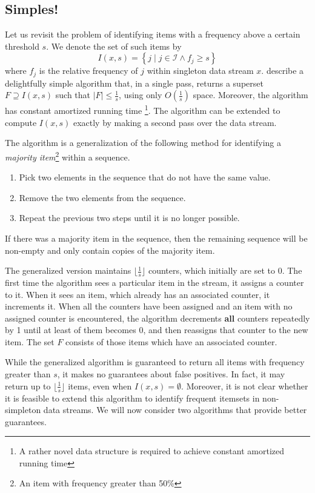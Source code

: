 \documentclass[a4paper]{article}
\begin{document}
\subsection{Simples!}
Let us revisit the problem of identifying items with a frequency above a certain threshold $s$. We denote the set of such items by 
$$I(x, s) = \left\{j \; | \; j \in \mathcal{I} \wedge f_j \geq s \right\}$$
where $f_j$ is the relative frequency of $j$ within singleton data stream $x$. \cite{Karp:2003:SAF:762471.762473} describe a delightfully simple algorithm that, in a single pass, returns a superset $F \supseteq I(x, s)$ such that $|F| \leq \frac{1}{s}$, using only $O(\frac{1}{s})$ space. Moreover, the algorithm has constant amortized running time \footnote{A rather novel data structure is required to achieve constant amortized running time}. The algorithm can be extended to compute $I(x, s)$ exactly by making a second pass over the data stream.

The algorithm is a generalization of the following method for identifying a \textit{majority item}\footnote{An item with frequency greater than 50\%} within a sequence.
\begin{enumerate}
\item Pick two elements in the sequence that do not have the same value.
\item Remove the two elements from the sequence.
\item Repeat the previous two steps until it is no longer possible.
\end{enumerate}
If there was a majority item in the sequence, then the remaining sequence will be non-empty and only contain copies of the majority item.

The generalized version maintains $\lfloor \frac{1}{s} \rfloor$ counters, which initially are set to 0. The first time the algorithm sees a particular item in the stream, it assigns a counter to it. When it sees an item, which already has an associated counter, it increments it. When all the counters have been assigned and an item with no assigned counter is encountered, the algorithm decrements \textbf{all} counters repeatedly by 1 until at least of them becomes 0, and then reassigns that counter to the new item. The set $F$ consists of those items which have an associated counter.

While the generalized algorithm is guaranteed to return all items with frequency greater than $s$, it makes no guarantees about false positives. In fact, it may return up to $\lfloor \frac{1}{s} \rfloor$ items, even when $I(x, s) = \emptyset$. Moreover, it is not clear whether it is feasible to extend this algorithm to identify frequent itemsets in non-simpleton data streams. We will now consider two algorithms that provide better guarantees.
\end{document}

